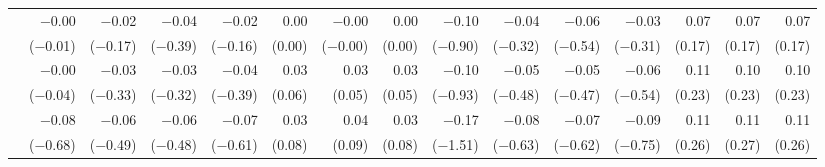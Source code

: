 \begin{tabularx}{1.45\textwidth}{lRRRRRRRRRRRRRR}
		 & \num{-0.00}\phantom{***)} & \num{-0.02}\phantom{***)} & \num{-0.04}\phantom{***)} & \num{-0.02}\phantom{***)} & \num{0.00}\phantom{***)} & \num{-0.00}\phantom{***)} & \num{0.00}\phantom{***)} & \num{-0.10}\phantom{***)} & \num{-0.04}\phantom{***)} & \num{-0.06}\phantom{***)} & \num{-0.03}\phantom{***)} & \num{0.07}\phantom{***)} & \num{0.07}\phantom{***)} & \num{0.07}\phantom{***)} \\
		 & (\num{-0.01})\phantom{***} & (\num{-0.17})\phantom{***} & (\num{-0.39})\phantom{***} & (\num{-0.16})\phantom{***} & (\num{0.00})\phantom{***} & (\num{-0.00})\phantom{***} & (\num{0.00})\phantom{***} & (\num{-0.90})\phantom{***} & (\num{-0.32})\phantom{***} & (\num{-0.54})\phantom{***} & (\num{-0.31})\phantom{***} & (\num{0.17})\phantom{***} & (\num{0.17})\phantom{***} & (\num{0.17})\phantom{***} \\ [\dspacing]
		 & \num{-0.00}\phantom{***)} & \num{-0.03}\phantom{***)} & \num{-0.03}\phantom{***)} & \num{-0.04}\phantom{***)} & \num{0.03}\phantom{***)} & \num{0.03}\phantom{***)} & \num{0.03}\phantom{***)} & \num{-0.10}\phantom{***)} & \num{-0.05}\phantom{***)} & \num{-0.05}\phantom{***)} & \num{-0.06}\phantom{***)} & \num{0.11}\phantom{***)} & \num{0.10}\phantom{***)} & \num{0.10}\phantom{***)} \\
		 & (\num{-0.04})\phantom{***} & (\num{-0.33})\phantom{***} & (\num{-0.32})\phantom{***} & (\num{-0.39})\phantom{***} & (\num{0.06})\phantom{***} & (\num{0.05})\phantom{***} & (\num{0.05})\phantom{***} & (\num{-0.93})\phantom{***} & (\num{-0.48})\phantom{***} & (\num{-0.47})\phantom{***} & (\num{-0.54})\phantom{***} & (\num{0.23})\phantom{***} & (\num{0.23})\phantom{***} & (\num{0.23})\phantom{***} \\ [\dspacing]
		 & \num{-0.08}\phantom{***)} & \num{-0.06}\phantom{***)} & \num{-0.06}\phantom{***)} & \num{-0.07}\phantom{***)} & \num{0.03}\phantom{***)} & \num{0.04}\phantom{***)} & \num{0.03}\phantom{***)} & \num{-0.17}\phantom{***)} & \num{-0.08}\phantom{***)} & \num{-0.07}\phantom{***)} & \num{-0.09}\phantom{***)} & \num{0.11}\phantom{***)} & \num{0.11}\phantom{***)} & \num{0.11}\phantom{***)} \\
		 & (\num{-0.68})\phantom{***} & (\num{-0.49})\phantom{***} & (\num{-0.48})\phantom{***} & (\num{-0.61})\phantom{***} & (\num{0.08})\phantom{***} & (\num{0.09})\phantom{***} & (\num{0.08})\phantom{***} & (\num{-1.51})\phantom{***} & (\num{-0.63})\phantom{***} & (\num{-0.62})\phantom{***} & (\num{-0.75})\phantom{***} & (\num{0.26})\phantom{***} & (\num{0.27})\phantom{***} & (\num{0.26})\phantom{***} \\ [\dspacing]

\end{tabularx}
